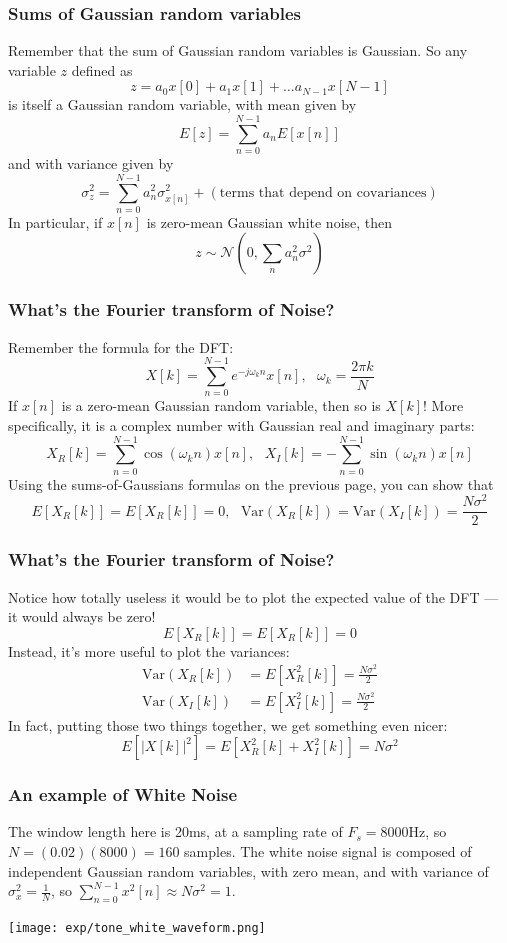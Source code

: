 \documentclass{beamer}
\begin{document}
\begin{frame}
  \frametitle{Sums of Gaussian random variables}
  Remember that the sum of Gaussian random variables is Gaussian. So any variable $z$ defined as
  \[
  z = a_0 x[0]+a_1x[1]+\ldots a_{N-1}x[N-1]
  \]
  is itself a Gaussian random variable, with mean given by
  \[
  E[z] = \sum_{n=0}^{N-1} a_n E[x[n]]
  \]
  and with variance given by
  \[
  \sigma_z^2 = \sum_{n=0}^{N-1}a_n^2 \sigma_{x[n]}^2 + \left(\mbox{terms that depend on covariances}\right)
  \]
  In particular, if $x[n]$ is zero-mean Gaussian white noise, then
  \[
  z\sim {\mathcal N}(0,\sum_n a_n^2\sigma^2)
  \]
\end{frame}

\begin{frame}
  \frametitle{What's the Fourier transform of Noise?}

  Remember the formula for the DFT:
  \[
  X[k] =\sum_{n=0}^{N-1} e^{-j\omega_k n}x[n],~~~\omega_k=\frac{2\pi k}{N}
  \]
  If $x[n]$ is a zero-mean Gaussian random variable, then so is $X[k]$!
  More specifically, it is a complex number with Gaussian real and imaginary parts:
  \[
  X_R[k]=\sum_{n=0}^{N-1} \cos(\omega_k n)x[n],~~~
  X_I[k]=-\sum_{n=0}^{N-1} \sin(\omega_k n)x[n]
  \]
  Using the sums-of-Gaussians formulas on the previous page, you can show that
  \[
  E\left[X_R[k]\right]=E\left[X_R[k]\right]=0,~~~
  \mbox{Var}\left(X_R[k]\right)=\mbox{Var}\left(X_I[k]\right)=\frac{N\sigma^2}{2}
  \]
\end{frame}

\begin{frame}
  \frametitle{What's the Fourier transform of Noise?}

  Notice how totally useless it would be to plot the expected value of
  the DFT --- it would always be zero!
  \[
  E\left[X_R[k]\right]=E\left[X_R[k]\right]=0
  \]
  Instead, it's more useful to plot the variances:
  \begin{align*}
  \mbox{Var}\left(X_R[k]\right) &=E\left[X_R^2[k]\right]=\frac{N\sigma^2}{2}  \\
  \mbox{Var}\left(X_I[k]\right) &=E\left[X_I^2[k]\right]=\frac{N\sigma^2}{2}
  \end{align*}
  In fact, putting those two things together, we get something even nicer:
  \[
  E\left[|X[k]|^2\right] = E\left[X_R^2[k]+X_I^2[k]\right] = N\sigma^2
  \]
\end{frame}

\begin{frame}
  \frametitle{An example of White Noise}

  The window length here is 20ms, at a sampling rate of $F_s=8000$Hz,
  so $N=(0.02)(8000)=160$ samples.  The white noise signal is composed
  of independent Gaussian random variables, with zero mean, and with
  variance of $\sigma_x^2=\frac{1}{N}$, so
  $\sum_{n=0}^{N-1}x^2[n] \approx N\sigma^2 = 1$.
  
  \centerline{\texttt{[image: exp/tone\_white\_waveform.png]}}
\end{frame}
\end{document}
